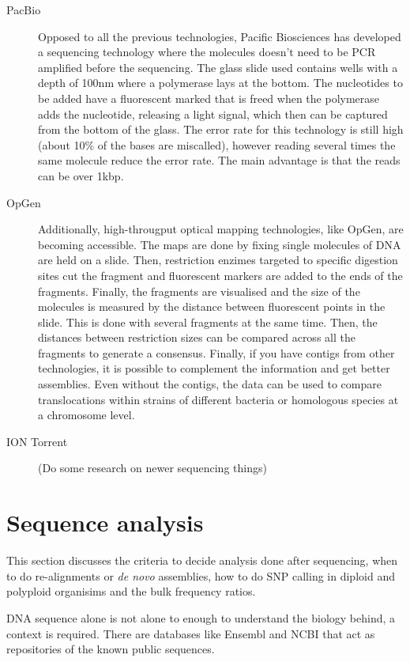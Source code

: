 \begin{description}
\item[PacBio] Opposed to all the previous technologies, Pacific Biosciences has developed a sequencing technology where the molecules doesn't need to be PCR amplified before the sequencing. The glass slide used contains wells with a depth of 100nm where a polymerase lays at the bottom. The nucleotides to be added have a fluorescent marked that is freed when the polymerase adds the nucleotide, releasing a light signal, which then can be captured from the bottom of the glass. The error rate for this technology is still high (about 10\% of the bases are miscalled), however reading several times the same molecule reduce the error rate. The main advantage is that the reads can be over 1kbp. 

\item[OpGen] Additionally, high-througput optical mapping technologies, like OpGen, are becoming accessible.  The maps are done by fixing single molecules of DNA are held on a slide. Then,  restriction enzimes targeted to specific digestion sites cut the fragment and fluorescent markers are added to the ends of the fragments. Finally, the fragments are visualised and the size of the molecules is measured by the distance between fluorescent points in the slide. This is done with several fragments at the same time. Then, the distances between restriction sizes can be compared across all the fragments to generate a consensus. Finally, if you have contigs from other technologies, it is possible to complement the information and get better assemblies. Even without the contigs, the data can be used to compare translocations within strains of different bacteria or homologous species at a chromosome level. 

\item[ION Torrent] (Do some research on newer sequencing things)

\end{description}

\section{Sequence analysis}
This section discusses the criteria to decide analysis done after sequencing, when to do re-alignments or \textit{de novo} assemblies, how to do SNP calling in diploid and polyploid organisims and the bulk frequency ratios.  



DNA sequence alone is not alone to enough to understand the biology behind, a context is required. There are databases like Ensembl and NCBI that act as repositories of the known public sequences. 

